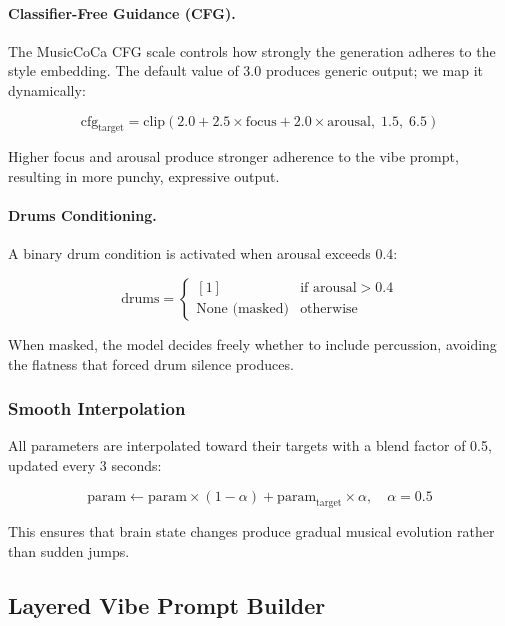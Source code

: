 \documentclass[manuscript,review,anonymous]{acmart}
\begin{document}
\paragraph{Classifier-Free Guidance (CFG).}
The MusicCoCa CFG scale controls how strongly the generation adheres to the style embedding. The default value of 3.0 produces generic output; we map it dynamically:

\begin{equation}
  \text{cfg}_{\text{target}} = \text{clip}(2.0 + 2.5 \times \text{focus} + 2.0 \times \text{arousal}, \; 1.5, \; 6.5)
\end{equation}

Higher focus and arousal produce stronger adherence to the vibe prompt, resulting in more punchy, expressive output.

\paragraph{Drums Conditioning.}
A binary drum condition is activated when arousal exceeds 0.4:

\begin{equation}
  \text{drums} = \begin{cases} [1] & \text{if arousal} > 0.4 \\ \text{None (masked)} & \text{otherwise} \end{cases}
\end{equation}

When masked, the model decides freely whether to include percussion, avoiding the flatness that forced drum silence produces.

\subsubsection{Smooth Interpolation}

All parameters are interpolated toward their targets with a blend factor of 0.5, updated every 3 seconds:

\begin{equation}
  \text{param} \leftarrow \text{param} \times (1 - \alpha) + \text{param}_{\text{target}} \times \alpha, \quad \alpha = 0.5
\end{equation}

This ensures that brain state changes produce gradual musical evolution rather than sudden jumps.

\subsection{Layered Vibe Prompt Builder}
\end{document}
